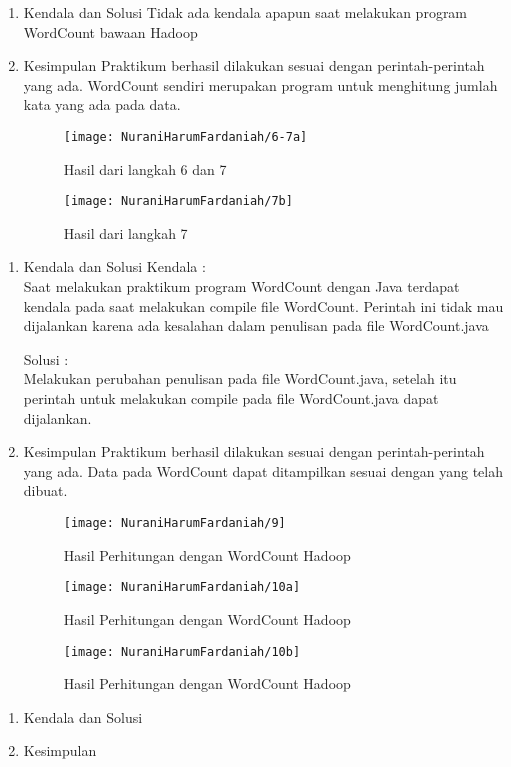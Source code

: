 \begin{enumerate}
\item Kendala dan Solusi
\newline Tidak ada kendala apapun saat melakukan program WordCount bawaan Hadoop

\item Kesimpulan
\newline Praktikum berhasil dilakukan sesuai dengan perintah-perintah yang ada. WordCount sendiri merupakan program untuk menghitung jumlah kata yang ada pada data.


\begin{figure}[!ht]
\texttt{[image: NuraniHarumFardaniah/6-7a]}
\caption{Hasil dari langkah 6 dan 7}
\label{gam:perkuliahan-25-11}
\end{figure}
\newpage
\begin{figure}[!ht]
\texttt{[image: NuraniHarumFardaniah/7b]}
\caption{Hasil dari langkah 7}
\label{gam:perkuliahan-25-11}
\end{figure}

\end{enumerate}

\begin{enumerate}
\item Kendala dan Solusi
\newline Kendala :\\
Saat melakukan praktikum program WordCount dengan Java terdapat kendala pada saat melakukan compile file WordCount. Perintah ini tidak mau dijalankan karena ada kesalahan dalam penulisan pada file WordCount.java

Solusi :\\
Melakukan perubahan penulisan pada file WordCount.java, setelah itu perintah untuk melakukan compile pada file WordCount.java dapat dijalankan.

\item Kesimpulan
\newline Praktikum berhasil dilakukan sesuai dengan perintah-perintah yang ada. Data pada WordCount dapat ditampilkan sesuai dengan yang telah dibuat.


\begin{figure}[!ht]
\texttt{[image: NuraniHarumFardaniah/9]}
\caption{Hasil Perhitungan dengan WordCount Hadoop}
\label{gam:perkuliahan-25-11}
\end{figure}

\begin{figure}[!ht]
\texttt{[image: NuraniHarumFardaniah/10a]}
\caption{Hasil Perhitungan dengan WordCount Hadoop}
\label{gam:perkuliahan-25-11}
\end{figure}
\newpage
\begin{figure}[!ht]
\texttt{[image: NuraniHarumFardaniah/10b]}
\caption{Hasil Perhitungan dengan WordCount Hadoop}
\label{gam:perkuliahan-25-11}
\end{figure}

\end{enumerate}

\begin{enumerate}
\item Kendala dan Solusi

\item Kesimpulan

\end{enumerate}